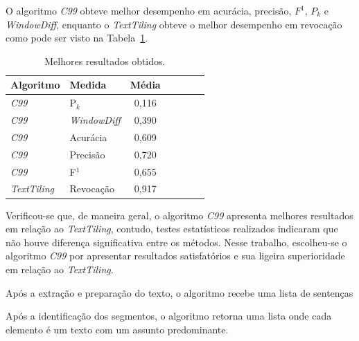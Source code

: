 O algoritmo \textit{C99} obteve melhor desempenho em acurácia, precisão, $F^1$, $P_k$ e \textit{WindowDiff}, enquanto o \textit{TextTiling} obteve o melhor desempenho em revocação como pode ser visto na Tabela~\ref{tab:configfinal}. 


\begin{table}[!h]
	\centering

	\begin{tabular}{|l|l|c|c|c|c|c|} \hline
		\textbf{Algoritmo} & 
		\textbf{Medida} & 
		\textbf{Média}\\	\hline

	\textit{C99} & P$_k$			   & 0,116 \\ \hline
	\textit{C99} & \textit{WindowDiff} & 0,390 \\ \hline
	\textit{C99} & Acurácia			   & 0,609 \\ \hline
	\textit{C99} & Precisão			   & 0,720 \\ \hline
	\textit{C99} & F$^1$			   & 0,655 \\ \hline
	\textit{TextTiling} &	Revocação  & 0,917 \\ \hline

	\end{tabular}
	
	\caption{Melhores resultados obtidos.}
	\label{tab:configfinal}
\end{table}





Verificou-se que, de maneira geral, o algoritmo \textit{C99} apresenta melhores resultados em relação ao \textit{TextTiling}, contudo, testes estatísticos realizados indicaram que não houve diferença significativa entre os métodos. Nesse trabalho, escolheu-se o algoritmo \textit{C99} por apresentar resultados satisfatórios e sua ligeira superioridade em relação ao \textit{TextTiling}. 





Após a extração e preparação do texto, o algoritmo recebe uma lista de sentenças 



Após a identificação dos segmentos, o algoritmo retorna uma lista onde cada elemento é um texto com um assunto predominante.

























